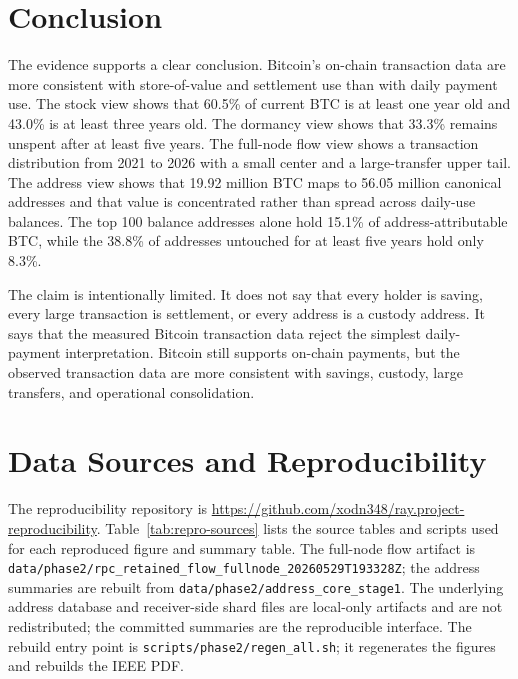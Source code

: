 \documentclass[conference]{IEEEtran}
\newcommand{\btc}{Bitcoin}
\newcommand{\datafile}[1]{\nolinkurl{#1}}
\begin{document}
\section{Conclusion}\label{sec:verdict}

The evidence supports a clear conclusion. \btc{}'s on-chain transaction data
are more consistent with store-of-value and settlement use than with daily
payment use. The stock view shows that 60.5\% of current BTC is at least one
year old and 43.0\% is at least three years old. The dormancy view shows
that 33.3\% remains unspent after at least five years. The full-node flow
view shows a transaction distribution from 2021 to 2026 with a small center
and a large-transfer upper tail. The address view shows that 19.92 million BTC
maps to 56.05 million canonical addresses and that value is concentrated
rather than spread across daily-use balances. The top 100 balance addresses
alone hold 15.1\% of address-attributable BTC, while the 38.8\% of addresses
untouched for at least five years hold only 8.3\%.

The claim is intentionally limited. It does not say that every holder is
saving, every large transaction is settlement, or every address is a custody
address. It says that the measured Bitcoin transaction data reject the
simplest daily-payment interpretation. Bitcoin still supports on-chain
payments, but the observed transaction data are more consistent with
savings, custody, large transfers, and operational consolidation.


\appendices

\section{Data Sources and Reproducibility}\label{app:data}

The reproducibility repository is \url{https://github.com/xodn348/ray.project-reproducibility}.
Table~\ref{tab:repro-sources} lists the source tables and scripts used for
each reproduced figure and summary table. The full-node flow artifact is
\datafile{data/phase2/rpc_retained_flow_fullnode_20260529T193328Z};
the address summaries are rebuilt from
\datafile{data/phase2/address_core_stage1}. The underlying address
database and receiver-side shard files are local-only artifacts and are
not redistributed; the committed summaries are the reproducible
interface. The rebuild entry point is
\datafile{scripts/phase2/regen_all.sh}; it regenerates the figures and
rebuilds the IEEE PDF.
\end{document}
